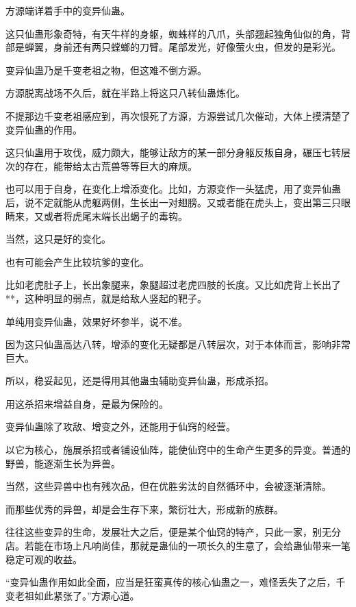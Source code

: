 
\begin{this_body}

方源端详着手中的变异仙蛊。

这只仙蛊形象奇特，有天牛样的身躯，蜘蛛样的八爪，头部翘起独角仙似的角，背部是蝉翼，身前还有两只螳螂的刀臂。尾部发光，好像萤火虫，但发的是彩光。

变异仙蛊乃是千变老祖之物，但这难不倒方源。

方源脱离战场不久后，就在半路上将这只八转仙蛊炼化。

不提那边千变老祖感应到，再次恨死了方源，方源尝试几次催动，大体上摸清楚了变异仙蛊的作用。

这只仙蛊用于攻伐，威力颇大，能够让敌方的某一部分身躯反叛自身，碾压七转层次的存在，能带给太古荒兽等等巨大的麻烦。

也可以用于自身，在变化上增添变化。比如，方源变作一头猛虎，用了变异仙蛊后，说不定就能从虎躯两侧，生长出一对翅膀。又或者能在虎头上，变出第三只眼睛来，又或者将虎尾末端长出蝎子的毒钩。

当然，这只是好的变化。

也有可能会产生比较坑爹的变化。

比如老虎肚子上，长出象腿来，象腿超过老虎四肢的长度。又比如虎背上长出了**，这种明显的弱点，就是给敌人竖起的靶子。

单纯用变异仙蛊，效果好坏参半，说不准。

因为这只仙蛊高达八转，增添的变化无疑都是八转层次，对于本体而言，影响非常巨大。

所以，稳妥起见，还是得用其他蛊虫辅助变异仙蛊，形成杀招。

用这杀招来增益自身，是最为保险的。

变异仙蛊除了攻敌、增变之外，还能用于仙窍的经营。

以它为核心，施展杀招或者铺设仙阵，能使仙窍中的生命产生更多的异变。普通的野兽，能逐渐生长为异兽。

当然，这些异兽中也有残次品，但在优胜劣汰的自然循环中，会被逐渐清除。

而那些优秀的异兽，却是会生存下来，繁衍壮大，形成新的族群。

往往这些变异的生命，发展壮大之后，便是某个仙窍的特产，只此一家，别无分店。若能在市场上凡响尚佳，那就是蛊仙的一项长久的生意了，会给蛊仙带来一笔稳定可观的收益。

“变异仙蛊作用如此全面，应当是狂蛮真传的核心仙蛊之一，难怪丢失了之后，千变老祖如此紧张了。”方源心道。


\end{this_body}
